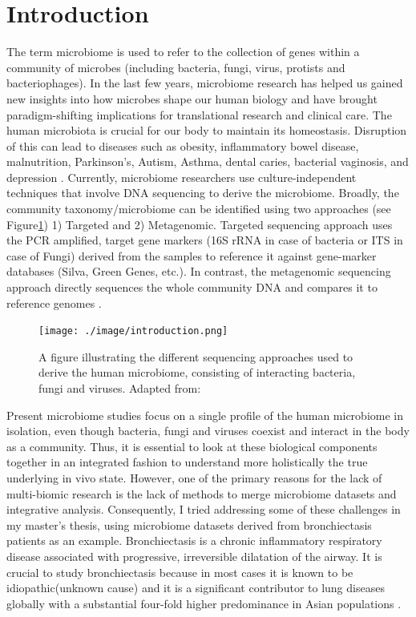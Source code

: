 \section{Introduction}

The term microbiome is used to refer to the collection of genes within a community of microbes (including bacteria, fungi, virus, protists and bacteriophages). In the last few years, microbiome research has helped us gained new insights into how microbes shape our human biology and have brought paradigm-shifting implications for translational research and clinical care. The human microbiota is crucial for our body to maintain its homeostasis. Disruption of this can lead to diseases such as obesity, inflammatory bowel disease, malnutrition, Parkinson's, Autism, Asthma, dental caries, bacterial vaginosis, and depression \cite{Knight2017}.  Currently, microbiome researchers use culture-independent techniques that involve DNA sequencing to derive the microbiome. Broadly, the community taxonomy/microbiome can be identified using two approaches (see Figure\ref{fig1}) 1) Targeted and 2) Metagenomic. Targeted sequencing approach uses the PCR amplified, target gene markers (16S rRNA in case of bacteria or ITS in case of Fungi) derived from the samples to reference it against gene-marker databases (Silva, Green Genes, etc.). In contrast, the metagenomic sequencing approach directly sequences the whole community DNA and compares it to reference genomes \cite{Morgan2012}.

\begin{figure}[ht]
	\centering
	\texttt{[image: ./image/introduction.png]}
	\caption{A figure illustrating the different sequencing approaches used to derive the human microbiome, consisting of interacting bacteria, fungi and viruses. Adapted from: \cite{Morgan2012}}
	\label{fig1}
\end{figure}

Present microbiome studies focus on a single profile of the human microbiome in isolation, even though bacteria, fungi and viruses coexist and interact in the body as a community. Thus, it is essential to look at these biological components together in an integrated fashion to understand more holistically the true underlying in vivo state. However, one of the primary reasons for the lack of multi-biomic research is the lack of methods to merge microbiome datasets and integrative analysis. Consequently, I tried addressing some of these challenges in my master's thesis, using microbiome datasets derived from bronchiectasis patients as an example. Bronchiectasis is a chronic inflammatory respiratory disease associated with progressive, irreversible dilatation of the airway. It is crucial to study bronchiectasis because in most cases it is known to be idiopathic(unknown cause) \cite{pmid29478908} and it is a significant contributor to lung diseases globally with a substantial four-fold higher predominance in Asian populations \cite{Seitz2012}. 

